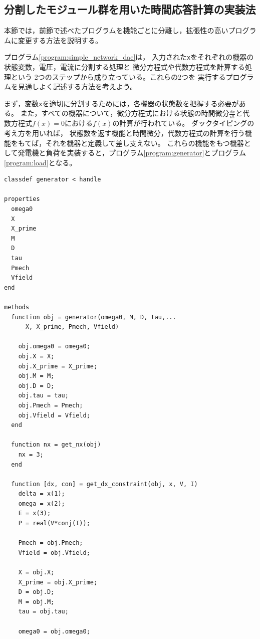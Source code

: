 \documentclass[tombow,dvipdfmx]{corona-a5-1.1}
\begin{document}
\subsection{分割したモジュール群を用いた時間応答計算の実装法}

本節では，前節で述べたプログラムを機能ごとに分離し，拡張性の高いプログラムに変更する方法を説明する。

\begin{例}[発電機と負荷のモジュール化]\label{ex:gen_load}
  プログラム\nobreak\ref{program:simple_network_dae}は，
  入力された\verb|x|をそれぞれの機器の状態変数，電圧，電流に分割する処理と
  微分方程式や代数方程式を計算する処理という
  2つのステップから成り立っている。これらの2つを
 実行するプログラムを見通しよく記述する方法を考えよう。
 
  まず，変数\verb|x|を適切に分割するためには，各機器の状態数を把握する必要がある。
  また，すべての機器について，微分方程式における状態の時間微分$\tfrac{dx}{dt}$と代数方程式$f(x)=0$における$f(x)$の計算が行われている。
  ダックタイピングの考え方を用いれば，
  状態数を返す機能と時間微分，代数方程式の計算を行う機能をもてば，それを機器と定義して差し支えない。
  これらの機能をもつ機器として発電機と負荷を実装すると，プログラム\nobreak\ref{program:generator}とプログラム\ref{program:load}となる。

\smallskip
\begin{PROGRAMA}[count,title={generator.m}]\label{program:generator}
\begin{verbatim}
classdef generator < handle
  
properties
  omega0
  X
  X_prime
  M
  D
  tau
  Pmech
  Vfield
end

methods
  function obj = generator(omega0, M, D, tau,...
      X, X_prime, Pmech, Vfield)

    obj.omega0 = omega0;
    obj.X = X;
    obj.X_prime = X_prime;
    obj.M = M;
    obj.D = D;
    obj.tau = tau;
    obj.Pmech = Pmech;
    obj.Vfield = Vfield;
  end

  function nx = get_nx(obj)
    nx = 3;
  end

  function [dx, con] = get_dx_constraint(obj, x, V, I)
    delta = x(1);
    omega = x(2);
    E = x(3);
    P = real(V*conj(I));

    Pmech = obj.Pmech;
    Vfield = obj.Vfield;

    X = obj.X;
    X_prime = obj.X_prime;
    D = obj.D;
    M = obj.M;
    tau = obj.tau;

    omega0 = obj.omega0;


\end{verbatim}
\end{PROGRAMA}
\end{例}
\end{document}

